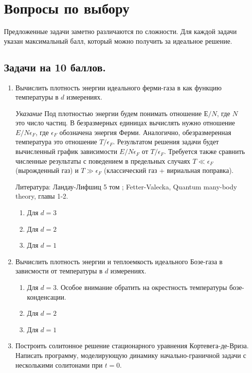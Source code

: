 \documentclass{article}
\newcounter{eee}
\begin{document}
\section*{Вопросы по выбору}


Предложенные задачи заметно различаются по сложности. Для каждой задачи указан максимальный балл, который можно получить за идеальное решение.



\subsection*{Задачи на 10 баллов.}

\begin{enumerate}

\item Вычислить плотность энергии идеального ферми-газа в как функцию температуры в $d$ измерениях. 

\textit{Указание} Под плотностью энергии будем понимать отношение $Е/N$, где $N$ это число частиц. В безразмерных единицах вычислять нужно отношение $E/N\epsilon_F$, где $\epsilon_F$ обозначена энергия Ферми. Аналогично, обезразмеренная температура это отношение $T/\epsilon_F$. Результатом решения задачи будет вычисленный график зависимости $E/N\epsilon_F$ от $T/\epsilon_F$. Требуется также сравнить численные результаты с поведением в предельных случаях $T \ll \epsilon_F$ (вырожденный газ) и $T \gg \epsilon_F$ (классический газ + вириальная поправка).

Литература: Ландау-Лифшиц 5 том ; Fetter-Valecka, Quantum many-body theory, главы 1-2.

\begin{enumerate}
\item Для $d = 3$
\item Для $d = 2$
\item Для $d = 1$
\end{enumerate}

\item Вычислить плотность энергии и теплоемкость идеального Бозе-газа в зависмости от температуры в $d$ измерениях. 

\begin{enumerate}
\item Для $d=3$. Особое внимание обратить на окрестность температуры бозе-конденсации.
\item Для $d=2$
\item Для $d=1$
\end{enumerate}

\item Построить солитонное решение стационарного уравнения Кортевега-де-Вриза. Написать программу, моделирующую динамику начально-граничной задачи с несколькими солитонами при $t=0$.

\setcounter{eee}{\value{enumi}}
\end{enumerate}
\end{document}
